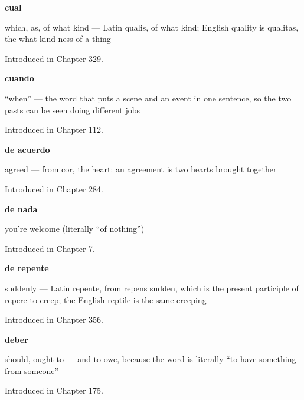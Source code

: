 \noindent\begin{minipage}[t]{\linewidth}
\raggedright
\textbf{cual}\par
\small which, as, of what kind — Latin qualis, of what kind; English quality is qualitas, the what-kind-ness of a thing\par
\footnotesize Introduced in Chapter 329.
\end{minipage}\par\medskip

\noindent\begin{minipage}[t]{\linewidth}
\raggedright
\textbf{cuando}\par
\small \textquotedblleft{}when\textquotedblright{} — the word that puts a scene and an event in one sentence, so the two pasts can be seen doing different jobs\par
\footnotesize Introduced in Chapter 112.
\end{minipage}\par\medskip

\noindent\begin{minipage}[t]{\linewidth}
\raggedright
\textbf{de acuerdo}\par
\small agreed — from cor, the heart: an agreement is two hearts brought together\par
\footnotesize Introduced in Chapter 284.
\end{minipage}\par\medskip

\noindent\begin{minipage}[t]{\linewidth}
\raggedright
\textbf{de nada}\par
\small you're welcome (literally \textquotedblleft{}of nothing\textquotedblright{})\par
\footnotesize Introduced in Chapter 7.
\end{minipage}\par\medskip

\noindent\begin{minipage}[t]{\linewidth}
\raggedright
\textbf{de repente}\par
\small suddenly — Latin repente, from repens sudden, which is the present participle of repere to creep; the English reptile is the same creeping\par
\footnotesize Introduced in Chapter 356.
\end{minipage}\par\medskip

\noindent\begin{minipage}[t]{\linewidth}
\raggedright
\textbf{deber}\par
\small should, ought to — and to owe, because the word is literally \textquotedblleft{}to have something from someone\textquotedblright{}\par
\footnotesize Introduced in Chapter 175.
\end{minipage}\par\medskip

